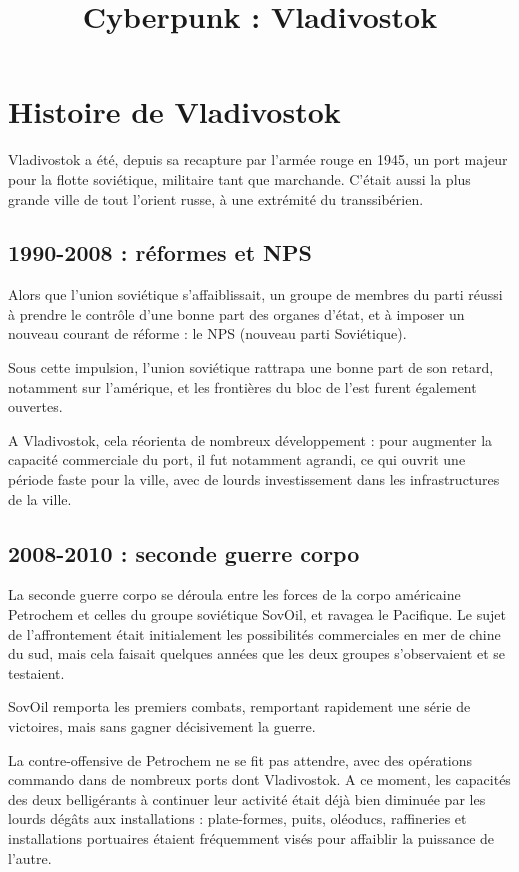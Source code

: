 \documentclass[10pt,a4paper]{book}
\title{Cyberpunk : Vladivostok}
\begin{document}
\maketitle
\tableofcontents

\chapter{Histoire de Vladivostok}
Vladivostok a été, depuis sa recapture par l'armée rouge en 1945, un port majeur pour la flotte soviétique, militaire tant que marchande. C'était aussi la plus grande ville de tout l'orient russe, à une extrémité du transsibérien.

\section{1990-2008 : réformes et NPS}
Alors que l'union soviétique s'affaiblissait, un groupe de membres du parti réussi à prendre le contrôle d'une bonne part des organes d'état, et à imposer un nouveau courant de réforme : le NPS (nouveau parti Soviétique). 

Sous cette impulsion, l'union soviétique rattrapa une bonne part de son retard, notamment sur l'amérique, et les frontières du bloc de l'est furent également ouvertes.

A Vladivostok, cela réorienta de nombreux développement : pour augmenter la capacité commerciale du port, il fut notamment agrandi, ce qui ouvrit une période faste pour la ville, avec de lourds investissement dans les infrastructures de la ville.
\section{2008-2010 : seconde guerre corpo}
La seconde guerre corpo se déroula entre les forces de la corpo américaine Petrochem et celles du groupe soviétique SovOil, et ravagea le Pacifique. Le sujet de l'affrontement était initialement les possibilités commerciales en mer de chine du sud, mais cela faisait quelques années que les deux groupes s'observaient et se testaient.

SovOil remporta les premiers combats, remportant rapidement une série de victoires, mais sans gagner décisivement la guerre.

La contre-offensive de Petrochem ne se fit pas attendre, avec des opérations commando dans de nombreux ports dont Vladivostok. A ce moment, les capacités des deux belligérants à continuer leur activité était déjà bien diminuée par les lourds dégâts aux installations : plate-formes, puits, oléoducs, raffineries et installations portuaires étaient fréquemment visés pour affaiblir la puissance de l'autre.
\end{document}
